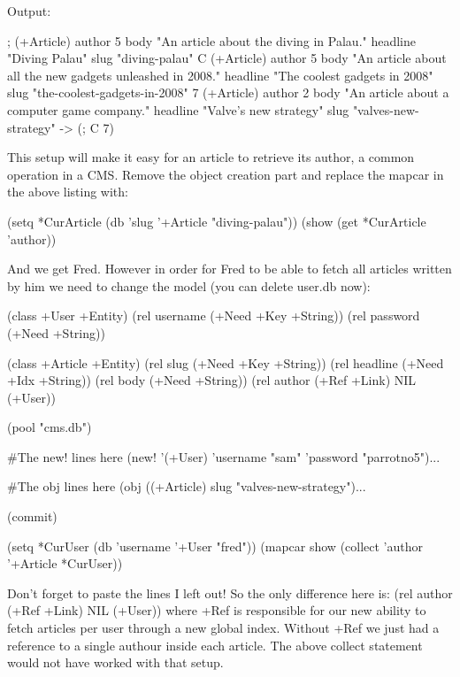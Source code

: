 Output:


\begin{wideverbatim}
{;} (+Article)
   author {5}
   body "An article about the diving in Palau."
   headline "Diving Palau"
   slug "diving-palau"
{C} (+Article)
   author {5}
   body "An article about all the new gadgets unleashed in 2008."
   headline "The coolest gadgets in 2008"
   slug "the-coolest-gadgets-in-2008"
{7} (+Article)
   author {2}
   body "An article about a computer game company."
   headline "Valve's new strategy"
   slug "valves-new-strategy"
-> ({;} {C} {7})
\end{wideverbatim}

This setup will make it easy for an article to retrieve its author, a
common operation in a CMS. Remove the object creation part and replace
the mapcar in the above listing with:


\begin{wideverbatim}
(setq *CurArticle (db 'slug '+Article "diving-palau"))
(show (get *CurArticle 'author))
\end{wideverbatim}

And we get Fred. However in order for Fred to be able to fetch all
articles written by him we need to change the model (you can delete
user.db now):


\begin{wideverbatim}
(class +User +Entity)
(rel username (+Need +Key +String))
(rel password (+Need +String))

(class +Article +Entity)
(rel slug     (+Need +Key +String))
(rel headline (+Need +Idx +String))
(rel body     (+Need +String))
(rel author   (+Ref +Link) NIL (+User))

(pool "cms.db")

#The new! lines here (new! '(+User) 'username "sam" 'password "parrotno5")...

#The obj lines here (obj ((+Article) slug "valves-new-strategy")...

(commit)

(setq *CurUser (db 'username '+User "fred"))
(mapcar show (collect 'author '+Article *CurUser))
\end{wideverbatim}

Don't forget to paste the lines I left out! So the only difference here
is: (rel author (+Ref +Link) NIL (+User)) where +Ref is responsible for
our new ability to fetch articles per user through a new global index.
Without +Ref we just had a reference to a single authour inside each
article. The above collect statement would not have worked with that
setup.

